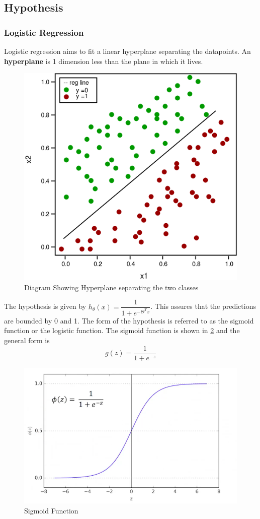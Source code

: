 \documentclass[12pt,a4paper,titlepage,landscape]{book}
\begin{document}
	 
	\subsection{Hypothesis}
	\subsubsection{Logistic Regression}
	Logistic regression aims to fit a linear hyperplane separating the datapoints. An \textbf{hyperplane} is 1 dimension less than the plane in which it lives. 

	\begin{figure}
		\centering
		\includegraphics[width=0.5\linewidth, height=0.5\textheight]{logistic-regression}
		
		\caption[]{Diagram Showing Hyperplane separating the two classes\protect\footnotemark}
		\label{fig:logistic-regression}
	\end{figure}
	The hypothesis is given by  $h_\theta(x) = \dfrac{1}{1+e^{-\Theta^Tx}}$. This assures that the predictions are bounded by 0 and 1. The form of the hypothesis is referred to as the sigmoid function or the logistic function. The sigmoid function is shown in \ref{fig:sigmoid} and the general form is $$g(z) = \dfrac{1}{1+e^{-z}} $$
	
	\begin{figure}
		\centering
		\includegraphics[width=0.4\linewidth]{sigmoid}
		\caption[Sigmoid]{Sigmoid Function\protect\footnotemark}
		\label{fig:sigmoid}
	\end{figure}
	
\end{document}
